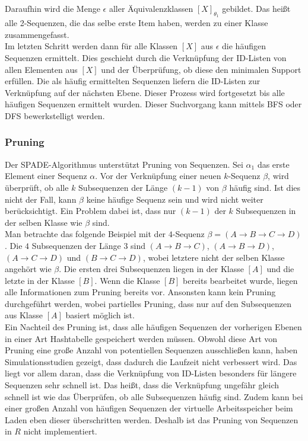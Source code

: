 Daraufhin wird die Menge $\epsilon$ aller Äquivalenzklassen $[X]_{\theta_1}$ gebildet. Das heißt alle 2-Sequenzen, die das selbe erste Item haben, werden zu einer Klasse zusammengefasst.\\
Im letzten Schritt werden dann für alle Klassen $[X]$ aus $\epsilon$ die häufigen Sequenzen ermittelt. Dies geschieht durch die Verknüpfung der ID-Listen von allen Elementen aus $[X]$ und der Überprüfung, ob diese den minimalen Support erfüllen. Die als häufig ermittelten Sequenzen liefern die ID-Listen zur Verknüpfung auf der nächsten Ebene. Dieser Prozess wird fortgesetzt bis alle häufigen Sequenzen ermittelt wurden. Dieser Suchvorgang kann mittels BFS oder DFS bewerkstelligt werden.\\

\subsubsection*{Pruning}
Der SPADE-Algorithmus unterstützt Pruning von Sequenzen. Sei $\alpha_1$ das erste Element einer Sequenz $\alpha$. Vor der Verknüpfung einer neuen $k$-Sequenz $\beta$, wird überprüft, ob alle $k$ Subsequenzen der Länge $(k-1)$ von $\beta$ häufig sind. Ist dies nicht der Fall, kann $\beta$ keine häufige Sequenz sein und wird nicht weiter berücksichtigt. Ein Problem dabei ist, dass nur $(k-1)$ der $k$ Subsequenzen in der selben Klasse wie $\beta$ sind.\\
Man betrachte das folgende Beispiel mit der $4$-Sequenz $\beta = (A\rightarrow B\rightarrow C\rightarrow D)$. Die $4$ Subsequenzen der Länge $3$ sind $(A\rightarrow B\rightarrow C)$, $(A\rightarrow B\rightarrow D)$, $(A\rightarrow C\rightarrow D)$ und $(B\rightarrow C\rightarrow D)$, wobei letztere nicht der selben Klasse angehört wie $\beta$. Die ersten drei Subsequenzen liegen in der Klasse $[A]$ und die letzte in der Klasse $[B]$. Wenn die Klasse $[B]$ bereits bearbeitet wurde, liegen alle Informationen zum Pruning bereits vor. Ansonsten kann kein Pruning durchgeführt werden, wobei partielles Pruning, dass nur auf den Subsequenzen aus Klasse $[A]$ basiert möglich ist.\\
Ein Nachteil des Pruning ist, dass alle häufigen Sequenzen der vorherigen Ebenen in einer Art Hashtabelle gespeichert werden müssen. Obwohl diese Art von Pruning eine große Anzahl von potentiellen Sequenzen ausschließen kann, haben Simulationsstudien \cite{spade} gezeigt, dass dadurch die Laufzeit nicht verbessert wird. Das liegt vor allem daran, dass die Verknüpfung von ID-Listen besonders für längere Sequenzen sehr schnell ist. Das heißt, dass die Verknüpfung ungefähr gleich schnell ist wie das Überprüfen, ob alle Subsequenzen häufig sind. Zudem kann bei einer großen Anzahl von häufigen Sequenzen der virtuelle Arbeitsspeicher beim Laden eben dieser überschritten werden. Deshalb ist das Pruning von Sequenzen in $R$ nicht implementiert.